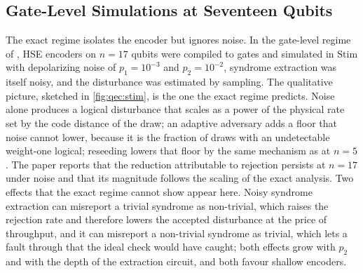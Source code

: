 \subsection{Gate-Level Simulations at Seventeen Qubits}\label{sec:qec:results17}

The exact regime isolates the encoder but ignores noise. In the gate-level regime of \cite{guo2026qecaudit}, HSE encoders on $n=17$ qubits were compiled to gates and simulated in Stim with depolarizing noise of $p_1=10^{-3}$ and $p_2=10^{-2}$, syndrome extraction was itself noisy, and the disturbance was estimated by sampling. The qualitative picture, sketched in \cref{fig:qec:stim}, is the one the exact regime predicts. Noise alone produces a logical disturbance that scales as a power of the physical rate set by the code distance of the draw; an adaptive adversary adds a floor that noise cannot lower, because it is the fraction of draws with an undetectable weight-one logical; reseeding lowers that floor by the same mechanism as at $n=5$. The paper reports that the reduction attributable to rejection persists at $n=17$ under noise and that its magnitude follows the scaling of the exact analysis. Two effects that the exact regime cannot show appear here. Noisy syndrome extraction can misreport a trivial syndrome as non-trivial, which raises the rejection rate and therefore lowers the accepted disturbance at the price of throughput, and it can misreport a non-trivial syndrome as trivial, which lets a fault through that the ideal check would have caught; both effects grow with $p_2$ and with the depth of the extraction circuit, and both favour shallow encoders.


